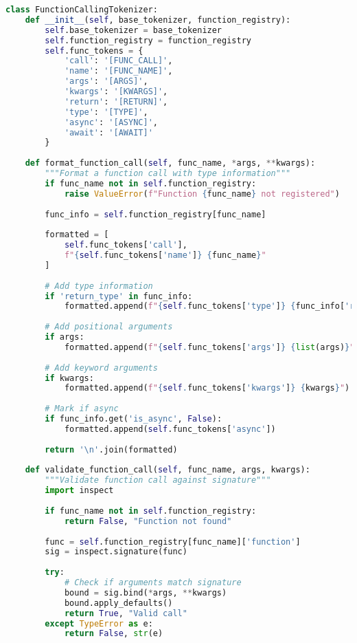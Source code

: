 \begin{lstlisting}[language=Python, caption=Function calling token system]
class FunctionCallingTokenizer:
    def __init__(self, base_tokenizer, function_registry):
        self.base_tokenizer = base_tokenizer
        self.function_registry = function_registry
        self.func_tokens = {
            'call': '[FUNC_CALL]',
            'name': '[FUNC_NAME]',
            'args': '[ARGS]',
            'kwargs': '[KWARGS]',
            'return': '[RETURN]',
            'type': '[TYPE]',
            'async': '[ASYNC]',
            'await': '[AWAIT]'
        }
        
    def format_function_call(self, func_name, *args, **kwargs):
        """Format a function call with type information"""
        if func_name not in self.function_registry:
            raise ValueError(f"Function {func_name} not registered")
        
        func_info = self.function_registry[func_name]
        
        formatted = [
            self.func_tokens['call'],
            f"{self.func_tokens['name']} {func_name}"
        ]
        
        # Add type information
        if 'return_type' in func_info:
            formatted.append(f"{self.func_tokens['type']} {func_info['return_type']}")
        
        # Add positional arguments
        if args:
            formatted.append(f"{self.func_tokens['args']} {list(args)}")
        
        # Add keyword arguments
        if kwargs:
            formatted.append(f"{self.func_tokens['kwargs']} {kwargs}")
        
        # Mark if async
        if func_info.get('is_async', False):
            formatted.append(self.func_tokens['async'])
        
        return '\n'.join(formatted)
    
    def validate_function_call(self, func_name, args, kwargs):
        """Validate function call against signature"""
        import inspect
        
        if func_name not in self.function_registry:
            return False, "Function not found"
        
        func = self.function_registry[func_name]['function']
        sig = inspect.signature(func)
        
        try:
            # Check if arguments match signature
            bound = sig.bind(*args, **kwargs)
            bound.apply_defaults()
            return True, "Valid call"
        except TypeError as e:
            return False, str(e)
    

\end{lstlisting}
